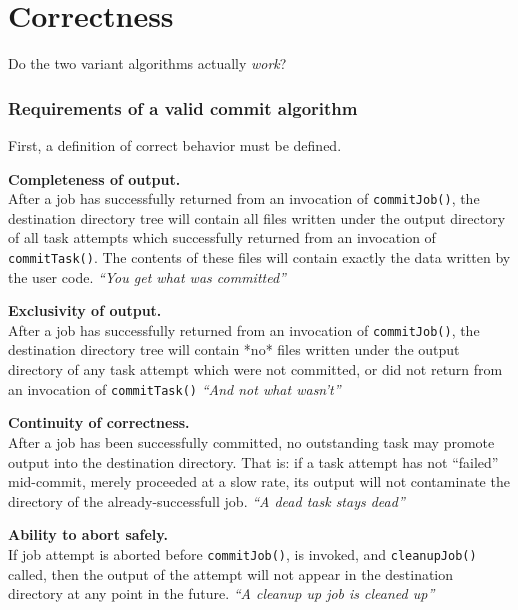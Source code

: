 \documentclass[conference]{IEEEtran}
\begin{document}
\section{Correctness}\label{sec:correctness}

Do the two variant algorithms actually \emph{work}?


\subsubsection{Requirements of a valid commit algorithm}

First, a definition of correct behavior must be defined.

\begin{paragraph}
  \textbf{Completeness of output.}\\
  After a job has successfully returned from an invocation of \texttt{commitJob()},
  the destination directory tree will contain all files written under the output directory
  of all task attempts which successfully returned from an invocation of \texttt{commitTask()}.
  The contents of these files will contain exactly the data written by the user code.
  \emph{``You get what was committed''}
\end{paragraph}

\begin{paragraph}
  \textbf{Exclusivity of output.}\\
  After a job has successfully returned from an invocation of \texttt{commitJob()},
  the destination directory tree will contain *no* files written under the output directory
  of any task attempt which were not committed, or did not return from an invocation of \texttt{commitTask()}
  \emph{``And not what wasn't''}
\end{paragraph}

\begin{paragraph}
  \textbf{Continuity of correctness.}\\
  After a job has been successfully committed, no outstanding task may promote
  output into the destination directory.
  That is: if a task attempt has not ``failed'' mid-commit, merely proceeded at a slow rate,
  its output will not contaminate the directory of the already-successfull job.
  \emph{``A dead task stays dead''}
\end{paragraph}

\begin{paragraph}
  \textbf{Ability to abort safely.}\\
  If job attempt is aborted before \texttt{commitJob()}, is invoked, and
  \texttt{cleanupJob()} called, then the output of the attempt will not appear in the
  destination directory at any point in the future.
  \emph{``A cleanup up job is cleaned up''}
\end{paragraph}
\end{document}
